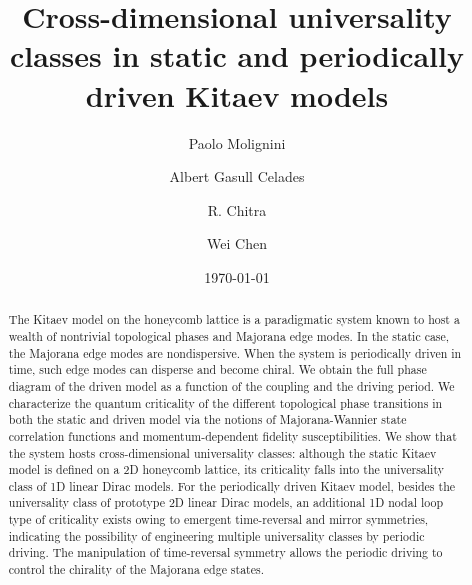 \documentclass[aps,prb,twocolumn,superscriptaddress,groupedaddress]{revtex4}
\newcommand{\cred}{\color{red}}
\begin{document}
\title{Cross-dimensional universality classes in static and periodically driven Kitaev models}



\date{\today}


\author{Paolo Molignini}
\author{Albert Gasull Celades}
\author{R. Chitra}
\author{Wei Chen}







\begin{abstract}

The Kitaev model on the honeycomb lattice is a paradigmatic system known to host a wealth of nontrivial topological phases and Majorana edge modes.
In the static case, the Majorana edge modes are nondispersive. 
When the system is periodically driven in time, such edge modes can disperse and become chiral.
We obtain the full phase diagram of the driven model as a function of the coupling and the driving period.
We characterize the quantum criticality of the different topological phase transitions in both the static and driven model via the notions of Majorana-Wannier state correlation functions and momentum-dependent fidelity susceptibilities.
We show that the system hosts cross-dimensional universality classes: although the static Kitaev model is defined on a 2D honeycomb lattice, its criticality falls into the universality class of 1D linear Dirac models. 
For the periodically driven Kitaev model, besides the universality class of prototype 2D linear Dirac models, an additional 1D nodal loop type of criticality exists owing to emergent time-reversal and mirror symmetries, indicating the possibility of engineering multiple universality classes by periodic driving. 
The manipulation of time-reversal symmetry allows the periodic driving to control the chirality of the Majorana edge states.


\end{abstract}
\end{document}
